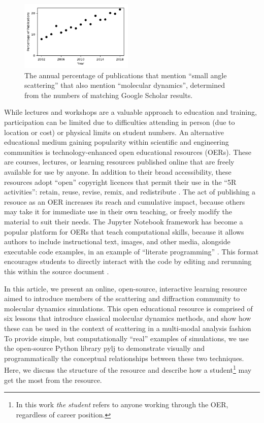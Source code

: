 \documentclass[amsmath,amssymb,twocolumn,superscriptaddress]{revtex4-1}
\begin{document}
%
\begin{figure}
\label{fig:growth}
\includegraphics[width=0.48\textwidth]{figures/chem_data_py.pdf}
\caption{The annual percentage of publications that mention ``small angle scattering'' that also mention ``molecular dynamics'', determined from the numbers of matching Google Scholar results.}
\end{figure}
%

While lectures and workshops are a valuable approach to education and training, participation can be limited due to difficulties attending in person (due to location or cost) or physical limits on student numbers.
An alternative educational medium gaining popularity within scientific and engineering communities is technology-enhanced open educational resources (OERs).
These are courses, lectures, or learning resources published online that are freely available for use by anyone. In addition to their broad accessibility, these resources adopt ``open'' copyright licences that permit their use in the ``5R activities'': retain, reuse, revise, remix, and redistribute \cite{wiley_open_2018}.
The act of publishing a resouce as an OER increases its reach and cumulative impact, because others may take it for immediate use in their own teaching, or freely modify the material to suit their needs.
The Jupyter Notebook framework \cite{kluyver_jupyter_2016} has become a popular platform for OERs that teach computational skills, because it allows authors to include instructional text, images, and other media, alongside executable code examples, in an example of ``literate programming'' \cite{knuth_literate_1984}.
This format encourages students to directly interact with the code by editing and rerunning this within the source document \cite{barba_cybertraining_2017}.

In this article, we present an online, open-source, interactive learning resource aimed to introduce members of the scattering and diffraction community to molecular dynamics simulations.
This open educational resource is comprised of six lessons that introduce classical molecular dynamics methods, and show how these can be used in the context of scattering in a multi-modal analysis fashion
To provide simple, but computationally ``real'' examples of simulations, we use the open-source Python library pylj \cite{mccluskey_pylj_2018} to demonstrate visually and programmatically the conceptual relationships between these two techniques.
Here, we discuss the structure of the resource and describe how a student\footnote{In this work \emph{the student} refers to anyone working through the OER, regardless of career position.} may get the most from the resource.
\end{document}
